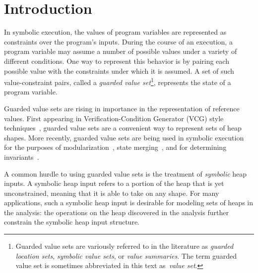 \section{Introduction}




%

In symbolic execution, the values of program variables are represented
as constraints over the program's inputs. During the course of an
execution, a program variable may assume a number of possible values
under a variety of different conditions. One way to represent this
behavior is by pairing each possible value with the constraints under
which it is assumed. A set of such value-constraint pairs, called a
\emph{guarded value set}\footnote{Guarded value sets are variously
  referred to in the literature as \emph{guarded location sets},
  \emph{symbolic value sets}, or \emph{value summaries}. The term
  guarded value set is sometimes abbreviated in this text
  as~\emph{value set}.}, represents the state of a program variable.

Guarded value sets are rising in importance in the representation of
reference values. First appearing in Verification-Condition Generator
(VCG) style techniques~\cite{Xie:2005,Dillig:2011}, guarded value sets
are a convenient way to represent sets of heap shapes. More recently,
guarded value sets are being used in symbolic execution for the
purposes of modularization~\cite{Yorsh:2008}, state
merging~\cite{Sen:2014}, and for determining
invariants~\cite{Ferrara:2014,Torlak:2014}.

A common hurdle to using guarded value sets is the treatment of
\emph{symbolic} heap inputs. A symbolic heap input refers to a portion of the heap that is yet unconstrained, meaning that it is able to take on any shape. For many applications, such a symbolic heap input is desirable for modeling sets of heaps in the analysis: the operations on the heap discovered in the analysis further constrain the symbolic heap input
structure.


